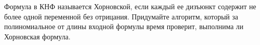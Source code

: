 Формула в КНФ называется Хорновской, если каждый ее дизъюнкт содержит не более одной переменной без
отрицания. Придумайте алгоритм, который за полиномиальное от длины входной формулы время проверит,
выполнима ли Хорновская формула.